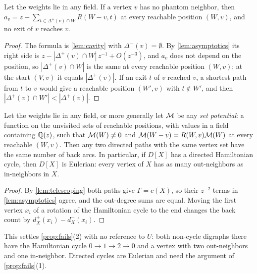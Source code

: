 \begin{theorem}\label{thm:no-phantom}
Let the weights lie in any field. If a vertex $v$ has no phantom neighbor, then $a_v=z-\sum_{t\in\Delta^{+}(v)\cap W}R(W-v,t)$ at every reachable position $(W,v)$, and no exit of $v$ reaches $v$.
\end{theorem}
\begin{proof}
The formula is \cref{lem:cavity} with $\Delta^{-}(v)=\emptyset$. By \cref{lem:asymptotics} its right side is $z-|\Delta^{+}(v)\cap W|\,z^{-1}+O(z^{-3})$, and $a_v$ does not depend on the position, so $|\Delta^{+}(v)\cap W|$ is the same at every reachable position $(W,v)$; at the start $(V,v)$ it equals $|\Delta^{+}(v)|$. If an exit $t$ of $v$ reached $v$, a shortest path from $t$ to $v$ would give a reachable position $(W',v)$ with $t\notin W'$, and then $|\Delta^{+}(v)\cap W'|<|\Delta^{+}(v)|$.
\end{proof}

\begin{theorem}\label{thm:cocycle}
Let the weights lie in any field, or more generally let $\mathcal{M}$ be any \emph{set potential}: a function on the unvisited sets of reachable positions, with values in a field containing $\mathbb{Q}(z)$, such that $\mathcal{M}(W)\neq0$ and $\mathcal{M}(W-v)=R(W,v)\mathcal{M}(W)$ at every reachable $(W,v)$. Then any two directed paths with the same vertex set have the same number of back arcs. In particular, if $D[X]$ has a directed Hamiltonian cycle, then $D[X]$ is Eulerian: every vertex of $X$ has as many out-neighbors as in-neighbors in $X$.
\end{theorem}
\begin{proof}
By \cref{lem:telescoping} both paths give $\Gamma=c(X)$, so their $z^{-2}$ terms in \cref{lem:asymptotics} agree, and the out-degree sums are equal. Moving the first vertex $x_i$ of a rotation of the Hamiltonian cycle to the end changes the back count by $d^{+}_X(x_i)-d^{-}_X(x_i)$.
\end{proof}

This settles \cref{prop:fails}(2) with no reference to $U$: both non-cycle digraphs there have the Hamiltonian cycle $0\to1\to2\to0$ and a vertex with two out-neighbors and one in-neighbor. Directed cycles are Eulerian and need the argument of \cref{prop:fails}(1).

